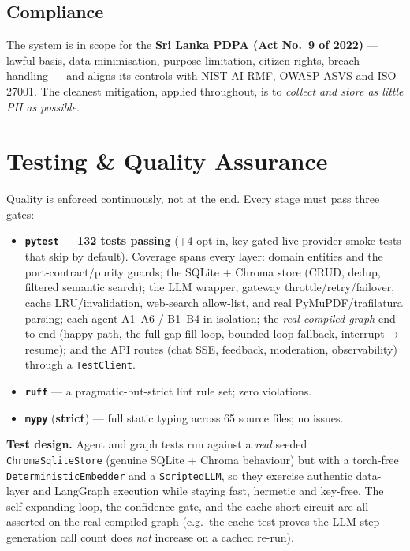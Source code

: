\documentclass[11pt,a4paper]{article}
\begin{document}
\subsection{Compliance}
The system is in scope for the \textbf{Sri Lanka PDPA (Act No.\ 9 of 2022)} --- lawful basis, data
minimisation, purpose limitation, citizen rights, breach handling --- and aligns its controls with
NIST AI RMF, OWASP ASVS and ISO 27001. The cleanest mitigation, applied throughout, is to
\emph{collect and store as little PII as possible}.

\section{Testing \& Quality Assurance}
\label{sec:testing}

Quality is enforced continuously, not at the end. Every stage must pass three gates:
\begin{itemize}[leftmargin=1.4em]
  \item \textbf{\texttt{pytest}} --- \textbf{132 tests passing} (+4 opt-in, key-gated live-provider
        smoke tests that skip by default). Coverage spans every layer: domain entities and the
        port-contract/purity guards; the SQLite + Chroma store (CRUD, dedup, filtered semantic
        search); the LLM wrapper, gateway throttle/retry/failover, cache LRU/invalidation, web-search
        allow-list, and real PyMuPDF/trafilatura parsing; each agent A1--A6 / B1--B4 in isolation; the
        \emph{real compiled graph} end-to-end (happy path, the full gap-fill loop, bounded-loop
        fallback, interrupt$\to$resume); and the API routes (chat SSE, feedback, moderation,
        observability) through a \texttt{TestClient}.
  \item \textbf{\texttt{ruff}} --- a pragmatic-but-strict lint rule set; zero violations.
  \item \textbf{\texttt{mypy}} (\textbf{strict}) --- full static typing across 65 source files; no
        issues.
\end{itemize}

\noindent\textbf{Test design.} Agent and graph tests run against a \emph{real} seeded
\texttt{ChromaSqliteStore} (genuine SQLite + Chroma behaviour) but with a torch-free
\texttt{DeterministicEmbedder} and a \texttt{ScriptedLLM}, so they exercise authentic data-layer and
LangGraph execution while staying fast, hermetic and key-free. The self-expanding loop, the
confidence gate, and the cache short-circuit are all asserted on the real compiled graph (e.g.\ the
cache test proves the LLM step-generation call count does \emph{not} increase on a cached re-run).
\end{document}
